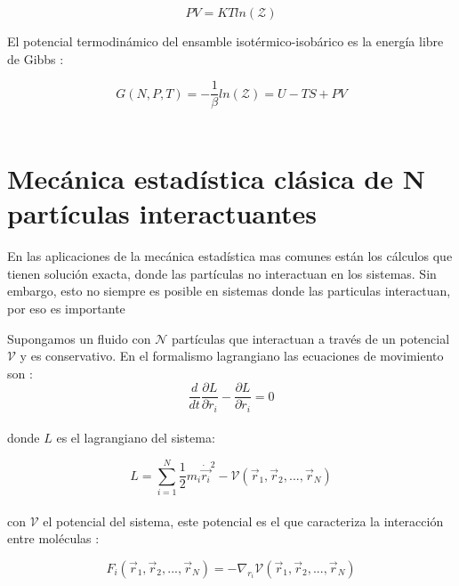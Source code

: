 \begin{equation} \label{ecestaNPT}
    PV=KTln(\mathcal{Z})
\end{equation}

El potencial termodinámico del ensamble isotérmico-isobárico es la energía libre de Gibbs \cite{mcquarrie1976}:

\begin{equation} \label{potgibbs}
    G(N,P,T)=-\frac{1}{\beta}ln(\mathcal{Z})=U-TS+PV
\end{equation}\\

\section{Mecánica estadística clásica de N partículas interactuantes
}

En las aplicaciones de la mecánica estadística mas comunes están los cálculos que tienen solución exacta, donde las partículas no interactuan en los sistemas. Sin embargo, esto no siempre es posible en sistemas donde las particulas interactuan, por eso es importante

Supongamos un fluido con $\mathcal{N}$ partículas que interactuan a través de un potencial $\mathcal{V}$ y es conservativo. En el formalismo lagrangiano las ecuaciones de movimiento son \cite{torresdelcastillo_2018}:\\

\begin{equation} \label{lagrangeeq}
    \frac{d}{dt}\frac{\partial L}{\partial \dot r_i} - \frac{\partial L}{\partial \dot r_i} = 0
\end{equation}\\

donde $L$ es el lagrangiano del sistema:

\begin{equation} \label{lagrangiano}
    L = \sum_{i=1}^{N} \frac{1}{2}m_i\dot{\vec{r_i}}^2-\mathcal{V}({\vec{r}}_1,{\vec{r}}_2,...,{\vec{r}}_N)
\end{equation}\\

con $\mathcal{V}$ el potencial del sistema, este potencial es el que caracteriza la interacción entre moléculas \cite{torresdelcastillo_2018}:

\begin{equation}
    F_i({\vec{r}}_1,{\vec{r}}_2,...,{\vec{r}}_N) = -\nabla_{r_i}\mathcal{V}({\vec{r}}_1,{\vec{r}}_2,...,{\vec{r}}_N)
\end{equation}\\

